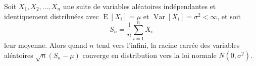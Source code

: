 \documentclass{article}
\begin{document}
Soit $X_1, X_2, \ldots, X_n$ une suite de variables aléatoires
indépendantes et identiquement distribuées avec
$\operatorname{E}[X_i] = \mu$ et $\operatorname{Var}[X_i] = \sigma^2 < \infty$,
et soit
\begin{equation*}
S_n = \frac{1}{n}\sum_{i=1}^{n} X_i
\end{equation*}
leur moyenne. Alors quand $n$ tend vers l'infini,
la racine carrée des variables aléatoires $\sqrt{n}(S_n - \mu)$
converge en distribution vers la loi normale $N(0, \sigma^2)$.

\end{document}
